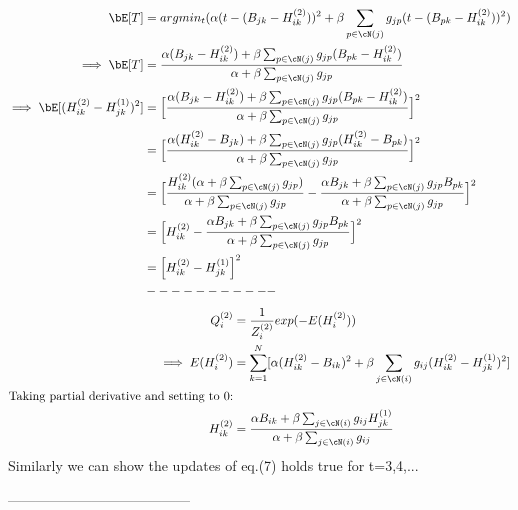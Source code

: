\begin{align*}
\bE[T] &= argmin_{t} (\alpha(t - (B_{jk} - H_{ik}^{(2)}))^2 + \beta\sum_{p\in\cN(j)}g_{jp}(t  - (B_{pk} -H_{ik}^{(2)}))^2)\\
\implies \bE[T] &= \frac{\alpha(B_{jk} - H_{ik}^{(2)}) + \beta\sum_{p\in\cN(j)}g_{jp}(B_{pk} -H_{ik}^{(2)})}{\alpha + \beta\sum_{p\in\cN(j)}g_{jp}} \\
\implies \bE[(H_{ik}^{(2)} - H_{jk}^{(1)})^2] &= \Big{[}\frac{\alpha(B_{jk} - H_{ik}^{(2)}) + \beta\sum_{p\in\cN(j)}g_{jp}(B_{pk} -H_{ik}^{(2)})}{\alpha + \beta\sum_{p\in\cN(j)}g_{jp}}\Big{]}^2\\
&=\Big{[}\frac{\alpha(H_{ik}^{(2)} - B_{jk}) + \beta\sum_{p\in\cN(j)}g_{jp}(H_{ik}^{(2)} - B_{pk})}{\alpha + \beta\sum_{p\in\cN(j)}g_{jp}}\Big{]}^2\\
&= \Big{[}\frac{H_{ik}^{(2)}(\alpha + \beta\sum_{p\in\cN(j)}g_{jp})}{\alpha + \beta\sum_{p\in\cN(j)}g_{jp}} - \frac{\alpha B_{jk} +  \beta\sum_{p\in\cN(j)}g_{jp}B_{pk}}{\alpha + \beta\sum_{p\in\cN(j)}g_{jp}}\Big{]}^2\\
&= \Big{[}H_{ik}^{(2)} - \frac{\alpha B_{jk} +  \beta\sum_{p\in\cN(j)}g_{jp}B_{pk}}{\alpha + \beta\sum_{p   \in\cN(j)}g_{jp}}\Big{]}^2\\
&=\Big{[}H_{ik}^{(2)} - H_{jk}^{(1)}\Big{]}^2\\
 &-----------\\
\end{align*} 
\begin{align*}
 Q_i^{(2)} &= \frac{1}{Z_{i}^{(2)}}exp(-E(H_i^{(2)})) \\
 \implies E(H_i^{(2)}) &= \sum_{k=1}^{N}[\alpha(H_{ik}^{(2)} - B_{ik})^2 + \beta\sum_{j\in\cN(i)}g_{ij}(H_{ik}^{(2)} - H_{jk}^{(1)})^2]\\
 \text{Taking partial derivative and setting to 0:}\\
 H_{ik}^{(2)} &= \frac{\alpha B_{ik} +  \beta\sum_{j\in\cN(i)}g_{ij}H_{jk}^{(1)}}{\alpha + \beta\sum_{j\in\cN(i)}g_{ij}}\\
\end{align*}
Similarly we can show the updates of eq.(7) holds true for t=3,4,...
\begin{center}
 ---------------------------------------
\end{center}

